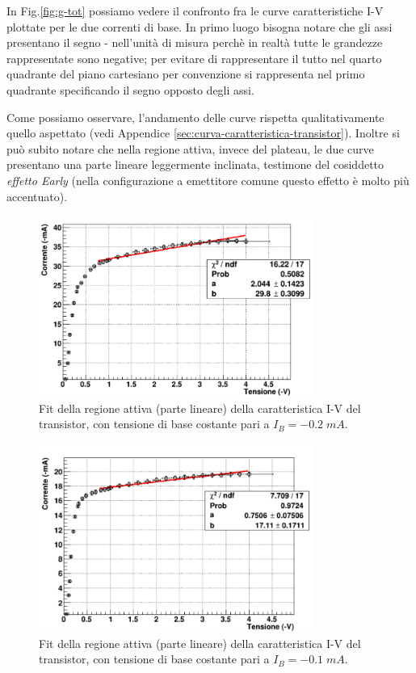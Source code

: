 \documentclass[a4paper, 11pt]{article}
\begin{document}
In Fig.\ref{fig:g-tot} possiamo vedere il confronto fra le curve caratteristiche I-V plottate per le due correnti di base. In primo luogo bisogna notare che gli assi presentano il segno - nell'unità di misura perchè in realtà tutte le grandezze rappresentate sono negative; per evitare di rappresentare il tutto nel quarto quadrante del piano cartesiano per convenzione si rappresenta nel primo quadrante specificando il segno opposto degli assi. 

Come possiamo osservare, l'andamento delle curve rispetta qualitativamente quello aspettato (vedi Appendice \ref{sec:curva-caratteristica-transistor}). Inoltre si può subito notare che nella regione attiva, invece del plateau, le due curve presentano una parte lineare leggermente inclinata, testimone del cosiddetto \textit{effetto Early} (nella configurazione a emettitore comune questo effetto è molto più accentuato). 

\begin{figure}[!htb]
    \centering
    \includegraphics[width=0.8\textwidth]{Immagini - Seconda prova/Fit-200.png}
    \caption{Fit della regione attiva (parte lineare) della caratteristica I-V del transistor, con tensione di base costante pari a $I_B = -0.2 \;mA $.}
    \label{fig:fit-200}
\end{figure}

\begin{figure}[!htb]
    \centering
    \includegraphics[width=0.8\textwidth]{Immagini - Seconda prova/Fit-100.png}
    \caption{Fit della regione attiva (parte lineare) della caratteristica I-V del transistor, con tensione di base costante pari a $I_B = -0.1 \;mA $.}
    \label{fig:fit-100}
\end{figure}
\end{document}
